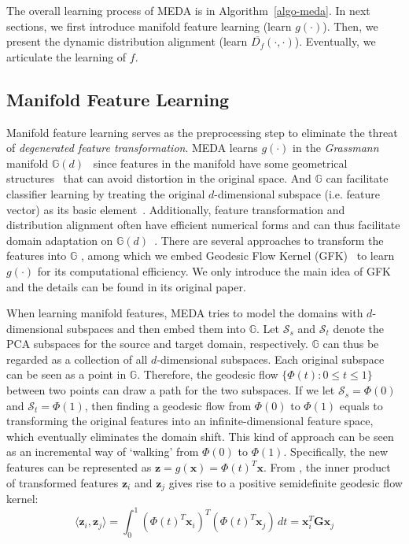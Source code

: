 \documentclass[sigconf]{acmart}
\begin{document}
The overall learning process of MEDA is in Algorithm~\ref{algo-meda}. In next sections, we first introduce manifold feature learning (learn $g(\cdot)$). Then, we present the dynamic distribution alignment (learn $\overline{D_f}(\cdot,\cdot)$). Eventually, we articulate the learning of $f$.

\subsection{Manifold Feature Learning}

Manifold feature learning serves as the preprocessing step to eliminate the threat of \textit{degenerated feature transformation}. MEDA learns $g(\cdot)$ in the \textit{Grassmann} manifold $\mathbb{G}(d)$~\cite{hamm2008grassmann} since features in the manifold have some geometrical structures~\cite{belkin2006manifold,hamm2008grassmann} that can avoid distortion in the original space. And $\mathbb{G}$ can facilitate classifier learning by treating the original $d$-dimensional subspace (i.e. feature vector) as its basic element~\cite{baktashmotlagh2014domain}. Additionally, feature transformation and distribution alignment often have efficient numerical forms and can thus facilitate domain adaptation on $\mathbb{G}(d)$~\cite{hamm2008grassmann}. There are several approaches to transform the features into $\mathbb{G}$ \cite{gopalan2011domain,baktashmotlagh2014domain}, among which we embed Geodesic Flow Kernel (GFK)~\cite{gong2012geodesic} to learn $g(\cdot)$ for its computational efficiency. We only introduce the main idea of GFK and the details can be found in its original paper.

When learning manifold features, MEDA tries to model the domains with $d$-dimensional subspaces and then embed them into $\mathbb{G}$. Let $\mathcal{S}_s$ and $\mathcal{S}_t$ denote the PCA subspaces for the source and target domain, respectively. $\mathbb{G}$ can thus be regarded as a collection of all $d$-dimensional subspaces. Each original subspace can be seen as a point in $\mathbb{G}$. Therefore, the geodesic flow $\{\Phi(t):0 \leq t \leq 1\}$ between two points can draw a path for the two subspaces. If we let $\mathcal{S}_s=\Phi(0)$ and $\mathcal{S}_t=\Phi(1)$, then finding a geodesic flow from $\Phi(0)$ to $\Phi(1)$ equals to transforming the original features into an infinite-dimensional feature space, which eventually eliminates the domain shift. This kind of approach can be seen as an incremental way of `walking' from $\Phi(0)$ to $\Phi(1)$. Specifically, the new features can be represented as $\mathbf{z}=g(\mathbf{x}) = \Phi(t)^T \mathbf{x}$. From \cite{gong2012geodesic}, the inner product of transformed features $\mathbf{z}_i$ and $\mathbf{z}_j$ gives rise to a positive semidefinite geodesic flow kernel:
\begin{equation}
	\label{equ-gfk}
	\langle\mathbf{z}_i,\mathbf{z}_j\rangle= \int_{0}^{1} (\Phi(t)^T \mathbf{x}_i)^T (\Phi(t)^T \mathbf{x}_j) \, dt = \mathbf{x}^T_i \mathbf{G} \mathbf{x}_j
\end{equation}
\end{document}

